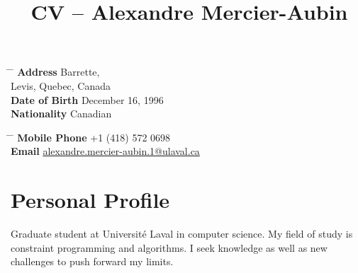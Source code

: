 \documentclass[10pt]{article} %
\begin{document}

\title{CV -- Alexandre Mercier-Aubin} %


\parbox{0.5\textwidth}{ %
\begin{tabbing} %
\hspace{3cm} \= \hspace{4cm} \= \kill %
{\bf Address}  Barrette,\\ %
\> Levis, Quebec, Canada \\ %
{\bf Date of Birth} \> December 16, 1996 \\ %
{\bf Nationality} \> Canadian %
\end{tabbing}}
\hfill %
\parbox{0.5\textwidth}{ %
\begin{tabbing} %
\hspace{3cm} \= \hspace{4cm} \= \kill %
{\bf Mobile Phone} \> +1 (418) 572 0698 \\ %
{\bf Email} \> \href{mailto:alexandre.mercier-aubin.1@ulaval.ca}{alexandre.mercier-aubin.1@ulaval.ca} \\ %
\end{tabbing}}


\section{Personal Profile}

Graduate student at Universit\'e Laval in computer science. My field of study is constraint programming and algorithms. I seek knowledge as well as new challenges to push forward my limits.

\end{document}
